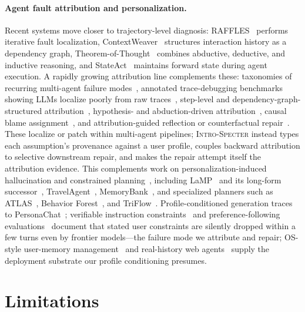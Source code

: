 \documentclass{article}
\newcommand{\method}{\textsc{Intro-Specter}\xspace}
\begin{document}
\paragraph{Agent fault attribution and personalization.}
Recent systems move closer to trajectory-level diagnosis: RAFFLES~\citep{zhu2026raffles} performs iterative fault localization, ContextWeaver~\citep{wu2026contextweaver} structures interaction history as a dependency graph, Theorem-of-Thought~\citep{abdaljalil2025theoremofthought} combines abductive, deductive, and inductive reasoning, and StateAct~\citep{rozanov2025stateact} maintains forward state during agent execution. A rapidly growing attribution line complements these: taxonomies of recurring multi-agent failure modes~\citep{cemri2025mast}, annotated trace-debugging benchmarks showing LLMs localize poorly from raw traces~\citep{deshpande2025trail,chen2026traceelephant}, step-level and dependency-graph-structured attribution~\citep{zhu2026stepfinder,hou2026edge}, hypothesis- and abduction-driven attribution~\citep{qiao2026verifymas,west2025abduct}, causal blame assignment~\citep{ma2025cdcmas}, and attribution-guided reflection or counterfactual repair~\citep{wang2026doctor,bonagiri2026causalflow}. These localize or patch within multi-agent pipelines; \method instead types each assumption's provenance against a user profile, couples backward attribution to selective downstream repair, and makes the repair attempt itself the attribution evidence. This complements work on personalization-induced hallucination and constrained planning~\citep{sun2024pfqabench,xie2024travelplanner}, including LaMP~\citep{salemi2023lamp} and its long-form successor~\citep{kumar2024longlamp}, TravelAgent~\citep{chen2024travelagent}, MemoryBank~\citep{zhong2024memorybank}, and specialized planners such as ATLAS~\citep{choi2025atlas}, Behavior Forest~\citep{yuan2026behaviorforest}, and TriFlow~\citep{chen2026triflow}. Profile-conditioned generation traces to PersonaChat~\citep{zhang2018persona}; verifiable instruction constraints~\citep{zhou2023ifeval} and preference-following evaluations~\citep{zhao2025prefeval} document that stated user constraints are silently dropped within a few turns even by frontier models---the failure mode we attribute and repair; OS-style user-memory management~\citep{packer2023memgpt} and real-history web agents~\citep{cai2025personalwab} supply the deployment substrate our profile conditioning presumes.

\section{Limitations}\label{sec:limitations}
\end{document}
